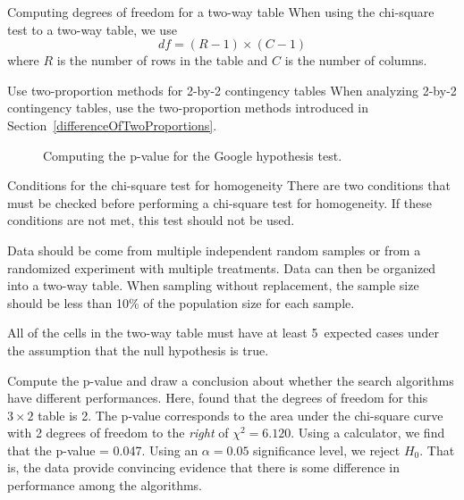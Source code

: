 \begin{onebox}{Computing degrees of freedom for a two-way table}
When using the chi-square test to a two-way table, we use
$$ df = (R-1)\times (C-1) $$
where $R$ is the number of rows in the table and $C$ is the number of columns.\end{onebox}

\begin{onebox}{Use two-proportion methods for 2-by-2 contingency tables}
When analyzing 2-by-2 contingency tables, use the two-proportion methods introduced in Section~\ref{differenceOfTwoProportions}.\end{onebox}

\begin{figure}[h]
\centering
{}
\caption{Computing the p-value for the Google hypothesis test.}
\label{googleHTForDiffAlgPerformancePValue}
\end{figure}

\D{\newpage}

\begin{onebox}{Conditions for the chi-square test for homogeneity}
There are two conditions that must be checked before performing a chi-square test for homogeneity. If these conditions are not met, this test should not be used.\vspace{-1mm}
\begin{description}
\setlength{\itemsep}{0mm}
\item[Independence.] Data should be come from multiple independent random samples or from a randomized experiment with multiple treatments. Data can then be organized into a two-way table.  When sampling without replacement, the sample size should be less than 10\% of the population size for each sample.
\item[Large expected counts. ] All of the cells in the two-way table must  have at least 5~expected cases under the assumption that the null hypothesis is true.
\end{description}\end{onebox}

\begin{examplewrap}
\begin{nexample}{Compute the p-value and draw a conclusion about whether the search algorithms have different performances.}
Here, found that the degrees of freedom for this $3\times 2$ table is 2.  The p-value corresponds to the area under the chi-square curve with 2 degrees of freedom to the \emph{right} of $\chi^2=6.120$.  Using a calculator, we find that the p-value = 0.047.  Using an $\alpha=0.05$ significance level, we reject $H_0$.  That is, the data provide convincing evidence that there is some difference in performance among the algorithms.
\end{nexample}
\end{examplewrap}

